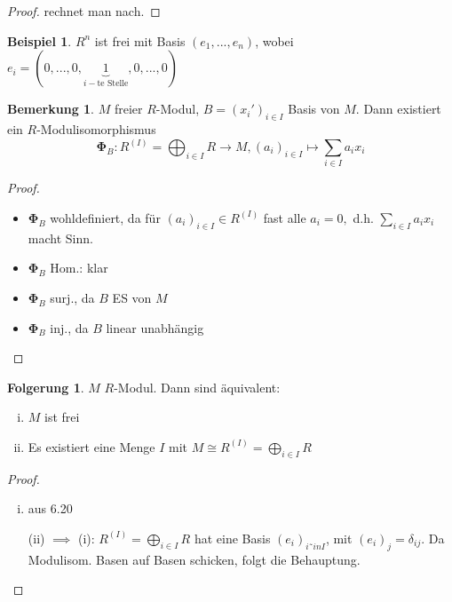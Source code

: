 \documentclass[a4paper, titlepage]{article}
\theoremstyle{definition}
\newtheorem{bsp}[satz]{Beispiel}
\newtheorem{bem}[satz]{Bemerkung}
\newtheorem*{fg}{Folgerung}
\begin{document}
        \begin{proof}
            rechnet man nach.
        \end{proof}
        \begin{bsp}
        $R^n$ ist frei mit Basis $(e_1,...,e_n)$, wobei $e_i=(0,...,0,\underbrace{1}_{i-\text{te Stelle}},0,...,0)$
        \end{bsp}
        \begin{bem}
            $M$ freier $R$-Modul, $B=(x_i')_{i\in I}$ Basis von $M.$ Dann existiert ein $R$-Modulisomorphismus
            $$\boldsymbol{\Phi}_B:R^{(I)}=\bigoplus_{i\in I}R\longrightarrow M,(a_i)_{i\in I}\mapsto \sum_{i\in I}a_ix_i$$
        \end{bem}
        \begin{proof}
            \begin{itemize}
                \item $\boldsymbol{\Phi}_B$ wohldefiniert, da für $(a_i)_{i\in I}\in R^{(I)}$ fast alle $a_i=0,$ d.h. $\sum_{i\in I}a_ix_i$ macht Sinn.
                \item  $\boldsymbol{\Phi}_{B}$ Hom.: klar 
                \item $\boldsymbol{\Phi}_{B}$ surj., da $B$ ES von $M$
                \item $\boldsymbol{\Phi}_{B}$ inj., da $B$ linear unabhängig
            \end{itemize}
        \end{proof}
        \begin{fg}
            $M$ $R$-Modul. Dann sind äquivalent:
            \begin{enumerate}[(i)]
                \item $M$ ist frei
                \item Es existiert eine Menge $I$ mit $M\cong R^{(I)}=\bigoplus\limits_{i\in I} R$
            \end{enumerate}
        \end{fg}
        \begin{proof}
            \begin{enumerate}[(i)$\implies$ (ii):]
                \item aus 6.20
                \item [(ii) $\implies$ (i):] $R^{(I)}=\bigoplus\limits_{i\in I}R$ hat eine Basis $(e_i)_{i˜in I}$, mit $(e_i)_j=\delta_{ij}.$ Da Modulisom. Basen auf Basen schicken, folgt die Behauptung. 
            \end{enumerate}
        \end{proof}
\end{document}
